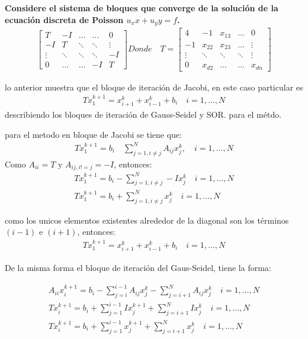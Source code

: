 \textbf{Considere el sistema de bloques que converge de la solución de la ecuación discreta de Poisson $u_xx + u_yy = f$.}
\begin{align*}
    \begin{bmatrix}
    T      & -I    &  \dots  & \dots  & 0\\
    -I     & T     &  \ddots & \ddots  & \vdots\\
    \vdots &\ddots &  \ddots & \ddots & -I\\
    0     &\dots   &  \dots  & -I     & T
\end{bmatrix}
Donde \quad T=
\begin{bmatrix}
    4 & -1 & x_{13} & \dots  & 0 \\
    -1 & x_{22} & x_{23} & \dots  & \vdots \\
    \vdots & \ddots & \ddots & \ddots & \vdots \\
    0 & x_{d2} & \dots & \dots  & x_{dn}
\end{bmatrix}
\end{align*}

lo anterior muestra que el bloque de iteración de Jacobi, en este caso particular es 
\begin{align*}
    Tx^{k+1}_{1} = x^{k}_{i+1} + x^{k}_{i-1} +b_{i} \quad i = 1,\dots, N
\end{align*}
describiendo los bloques de iteración de Gauss-Seidel y SOR.
para el métdo.

para el metodo en bloque de Jacobi se tiene que:
\begin{align*}
    Tx^{k+1}_{1}=b_i \quad \sum^{N}_{j = 1, i \neq j} A_{ij}x_j^k
,\quad i = 1,\dots, N
\end{align*}
Como $A_{ii} = T$ y $A_{ij, i != j}= -I$, entonces:
\begin{align*}
    Tx^{k+1}_{1}=b_i - \sum^{N}_{j = 1, i \neq j} -Ix_j^k \quad i = 1,\dots, N\\
    Tx^{k+1}_{1}=b_i + \sum^{N}_{j = 1, i \neq j} x_j^k \quad i = 1,\dots, N
\end{align*}

como los unicos elementos existentes alrededor de la diagonal son los términos $(i-1)$ e $(i+1)$, entonces:
\begin{align*}
    Tx^{k+1}_{1} = x^{k}_{i+1} + x^{k}_{i-1} + b_{i} \quad i = 1,\dots, N
\end{align*}

De la misma forma el bloque de iteración del Gaus-Seidel, tiene la forma:

\begin{align*}
    A_{ii}x_{i}^{k+1} = b_i - \sum^{i-1}_{j = i} A_{ij}x^{k}_j -\sum^{N}_{j = i + 1} A_{ij}x^{k}_j \quad i = 1,\dots, N\\
    Tx_{i}^{k+1} = b_i + \sum^{i-1}_{j = 1} Ix^{k + 1}_j +\sum^{N}_{j = i + 1} Ix^{k}_j \quad i = 1,\dots, N\\
    Tx_{i}^{k+1} = b_i + \sum^{i-1}_{j = 1} x^{k + 1}_j +\sum^{N}_{j = i + 1} x^{k}_j \quad i = 1,\dots, N\\
\end{align*}


